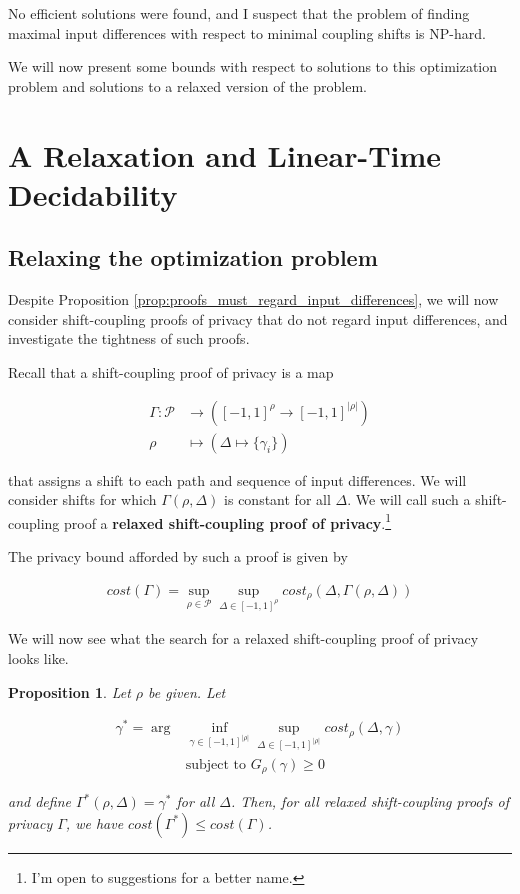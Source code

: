\documentclass{article}
\newtheorem{proposition}{Proposition}[section]
\newcommand{\1}{\langle 1 \rangle}
\newcommand{\2}{\langle 2 \rangle}
\begin{document}
No efficient solutions were found, and I suspect that the problem of finding maximal input differences with respect to minimal coupling shifts is NP-hard. 

We will now present some bounds with respect to solutions to this optimization problem and solutions to a relaxed version of the problem. 

\section{A Relaxation and Linear-Time Decidability}

\subsection{Relaxing the optimization problem}

Despite Proposition \ref{prop:proofs_must_regard_input_differences}, we will now consider shift-coupling proofs of privacy that do not regard input differences, and investigate the tightness of such proofs.

Recall that a shift-coupling proof of privacy is a map 

\begin{align*}
    \Gamma: \mathcal{P} &\to ([-1, 1]^{\rho} \to [-1, 1]^{|\rho|})\\
    \rho &\mapsto (\Delta \mapsto \{\gamma_i\})
\end{align*}

that assigns a shift to each path and sequence of input differences. We will consider shifts for which $\Gamma(\rho, \Delta)$ is constant for all $\Delta$. We will call such a shift-coupling proof a \textbf{relaxed shift-coupling proof of privacy}.\footnote{I'm open to suggestions for a better name.}

The privacy bound afforded by such a proof is given by

\begin{align*}
    cost(\Gamma) = \sup_{\rho \in \mathcal{P}} \sup_{\Delta \in [-1, 1]^{\rho}} cost_{\rho}(\Delta, \Gamma(\rho, \Delta))
\end{align*}

We will now see what the search for a relaxed shift-coupling proof of privacy looks like.

\begin{proposition}
    \label{prop:relaxed_shifts}
    Let $\rho$ be given. Let 

    \begin{align*}
        \gamma^* = \arg &\inf_{\gamma \in [-1, 1]^{|\rho|}} \sup_{\Delta \in [-1, 1]^{|\rho|}} cost_{\rho}(\Delta, \gamma)\\
        &\text{subject to } G_{\rho}(\gamma) \geq 0
    \end{align*}

    and define $\Gamma^*(\rho, \Delta) = \gamma^*$ for all $\Delta$. Then, for all relaxed shift-coupling proofs of privacy $\Gamma$, we have $cost(\Gamma^*) \leq cost(\Gamma)$.
\end{proposition}
\end{document}
